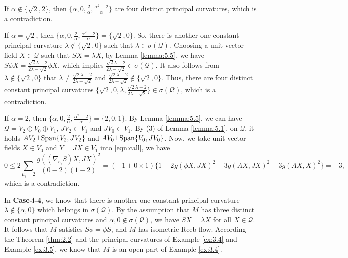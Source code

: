 \documentclass[reqno]{amsart}%
\theoremstyle{definition}
\numberwithin{equation}{section}
\begin{document}

If $\alpha\notin\{\sqrt{2},2\}$, then $\{\alpha,0,\frac{2}{\alpha},\tfrac{\alpha^2-2}{\alpha}\}$
are four distinct principal curvatures, which is a contradiction.

If $\alpha=\sqrt{2}$, then $\{\alpha,0,\frac{2}{\alpha},\tfrac{\alpha^2-2}{\alpha}\}=\{\sqrt{2},0\}$. So, there is another one constant principal curvature
$\lambda\notin \{\sqrt{2},0\}$ such that $\lambda\in \sigma(\mathcal{Q})$.
Choosing a unit vector field $X\in \mathcal{Q}$ such that $SX=\lambda X$, by Lemma \ref{lemma:5.5}, we have
$S\phi X=\frac{\sqrt{2}\lambda-2}{2\lambda-\sqrt{2}}\phi X$, which implies $\frac{\sqrt{2}\lambda-2}{2\lambda-\sqrt{2}}\in \sigma(\mathcal{Q})$. It also follows
from $\lambda\notin \{\sqrt{2},0\}$ that $\lambda\neq\frac{\sqrt{2}\lambda-2}{2\lambda-\sqrt{2}}$ and $\frac{\sqrt{2}\lambda-2}{2\lambda-\sqrt{2}}\notin\{\sqrt{2},0\}$. Thus, there are four distinct constant principal curvatures $\{\sqrt{2},0,\lambda,\frac{\sqrt{2}\lambda-2}{2\lambda-\sqrt{2}}\}\in \sigma(\mathcal{Q})$, which is a contradiction.

If $\alpha=2$, then $\{\alpha,0,\frac{2}{\alpha},\tfrac{\alpha^2-2}{\alpha}\}=\{2,0,1\}$.
By Lemma \ref{lemma:5.5}, we can have $\mathcal{Q}=V_2\oplus V_0\oplus V_1$, $JV_2\subset V_1$
and $JV_0\subset V_1$.
By (3) of Lemma \ref{lemma:5.1}, on $\mathcal{Q}$, it holds
$AV_2\bot {\rm Span}\{V_2, JV_2\}$ and $AV_0\bot {\rm Span}\{V_0, JV_0\}$.
Now, we take unit vector fields $X\in V_0$ and $Y=JX\in V_1$ into \eqref{eqn:call}, we have
%
\begin{equation*}
0\leq2\sum_{\mu_i=2}\frac{g((\nabla_{e_i} S)X,JX)^2}{(0-2)(1-2)}
=(-1+0\times1)\Big\{1+2g(\phi X,JX)^2-3g(AX,JX)^2-3g(AX,X)^2\Big\}=-3,
\end{equation*}
which is a contradiction.

In {\bf Case-i-4}, we know that there is another one constant principal curvature $\lambda\notin\{\alpha,0\}$ which belongs in $\sigma(\mathcal{Q})$. By
the assumption that $M$ has three distinct constant principal curvatures and
$\alpha,0\notin\sigma(\mathcal{Q})$, we have $SX=\lambda X$ for all $X\in\mathcal{Q}$. It follows  that $M$ satisfies $S\phi=\phi S$, and $M$ has isometric Reeb flow. According the Theorem \ref{thm:2.2} and the principal curvatures of Example \ref{ex:3.4} and Example \ref{ex:3.5}, we know
that $M$ is an open part of Example \ref{ex:3.4}.
\end{document}
